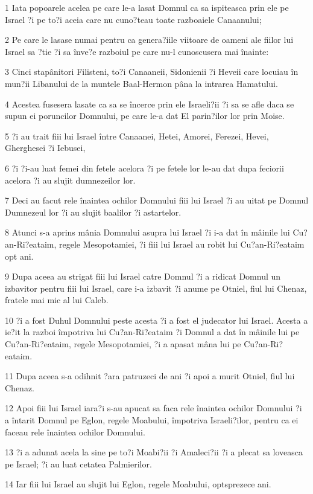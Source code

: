 \par 1 Iata popoarele acelea pe care le-a lasat Domnul ca sa ispiteasca prin ele pe Israel ?i pe to?i aceia care nu cuno?teau toate razboaiele Canaanului;
\par 2 Pe care le lasase numai pentru ca genera?iile viitoare de oameni ale fiilor lui Israel sa ?tie ?i sa înve?e razboiul pe care nu-l cunoscusera mai înainte:
\par 3 Cinci stapânitori Filisteni, to?i Canaaneii, Sidonienii ?i Heveii care locuiau în mun?ii Libanului de la muntele Baal-Hermon pâna la intrarea Hamatului.
\par 4 Acestea fusesera lasate ca sa se încerce prin ele Israeli?ii ?i sa se afle daca se supun ei poruncilor Domnului, pe care le-a dat El parin?ilor lor prin Moise.
\par 5 ?i au trait fiii lui Israel între Canaanei, Hetei, Amorei, Ferezei, Hevei, Gherghesei ?i Iebusei,
\par 6 ?i ?i-au luat femei din fetele acelora ?i pe fetele lor le-au dat dupa feciorii acelora ?i au slujit dumnezeilor lor.
\par 7 Deci au facut rele înaintea ochilor Domnului fiii lui Israel ?i au uitat pe Domnul Dumnezeul lor ?i au slujit baalilor ?i astartelor.
\par 8 Atunci s-a aprins mânia Domnului asupra lui Israel ?i i-a dat în mâinile lui Cu?an-Ri?eataim, regele Mesopotamiei, ?i fiii lui Israel au robit lui Cu?an-Ri?eataim opt ani.
\par 9 Dupa aceea au strigat fiii lui Israel catre Domnul ?i a ridicat Domnul un izbavitor pentru fiii lui Israel, care i-a izbavit ?i anume pe Otniel, fiul lui Chenaz, fratele mai mic al lui Caleb.
\par 10 ?i a fost Duhul Domnului peste acesta ?i a fost el judecator lui Israel. Acesta a ie?it la razboi împotriva lui Cu?an-Ri?eataim ?i Domnul a dat în mâinile lui pe Cu?an-Ri?eataim, regele Mesopotamiei, ?i a apasat mâna lui pe Cu?an-Ri?eataim.
\par 11 Dupa aceea s-a odihnit ?ara patruzeci de ani ?i apoi a murit Otniel, fiul lui Chenaz.
\par 12 Apoi fiii lui Israel iara?i s-au apucat sa faca rele înaintea ochilor Domnului ?i a întarit Domnul pe Eglon, regele Moabului, împotriva Israeli?ilor, pentru ca ei faceau rele înaintea ochilor Domnului.
\par 13 ?i a adunat acela la sine pe to?i Moabi?ii ?i Amaleci?ii ?i a plecat sa loveasca pe Israel; ?i au luat cetatea Palmierilor.
\par 14 Iar fiii lui Israel au slujit lui Eglon, regele Moabului, optsprezece ani.
